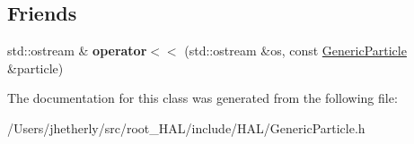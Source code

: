 \subsection*{Friends}
\begin{DoxyCompactItemize}
\item 
\hypertarget{class_h_a_l_1_1_generic_particle_a21417ca06cb919c843aa8c97cd734c1e}{std\+::ostream \& {\bfseries operator$<$$<$} (std\+::ostream \&os, const \hyperlink{class_h_a_l_1_1_generic_particle}{Generic\+Particle} \&particle)}\label{class_h_a_l_1_1_generic_particle_a21417ca06cb919c843aa8c97cd734c1e}

\end{DoxyCompactItemize}


The documentation for this class was generated from the following file\+:\begin{DoxyCompactItemize}
\item 
/\+Users/jhetherly/src/root\+\_\+\+H\+A\+L/include/\+H\+A\+L/Generic\+Particle.\+h\end{DoxyCompactItemize}
